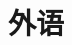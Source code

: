 \documentclass[11pt,a4paper,sans]{moderncv} %
\begin{document}
\section{外语}
\begin{small}
\end{small}



% 
% 









\end{document}
